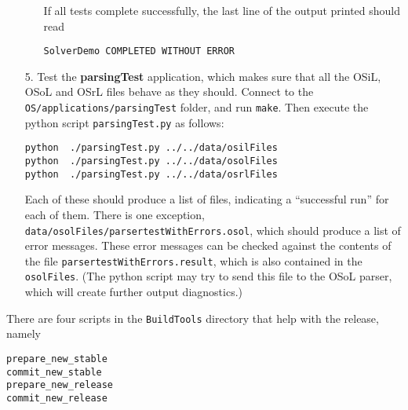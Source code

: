 \begin{itemize}
\begin{itemize}
If all tests complete successfully, the last line of the output printed should read
\begin{verbatim}
SolverDemo COMPLETED WITHOUT ERROR
\end{verbatim}

\end{itemize}


\iffalse
\item[b.] Test the {\bf OSFileUpload} application.    Edit  {\bf OSFileUpload.cpp}. First comment out line 79 and then modify line 
\begin{verbatim}
osagent = new OSSolverAgent("http://******/os/servlet/OSFileUpload");
\end{verbatim}
to
{\small
\begin{verbatim}
osagent = new OSSolverAgent("http://gsbkip.chicagogsb.edu/os/servlet/OSFileUpload");
\end{verbatim}
}
Rebuild and run. This application takes one command line argument which is the file to be uploaded. 
\fi


\item[5.] Test the {\bf parsingTest} application, which makes sure that all the OSiL, OSoL and OSrL files behave as they should. Connect to the {\tt OS/applications/parsingTest} folder, and run {\tt make}.  Then execute the python script {\tt parsingTest.py} as follows:  

\begin{verbatim}
python  ./parsingTest.py ../../data/osilFiles
python  ./parsingTest.py ../../data/osolFiles
python  ./parsingTest.py ../../data/osrlFiles
\end{verbatim}

Each of these should produce a list of files, indicating a ``successful run'' for each of them. There is one exception, {\tt data/osolFiles/parsertestWithErrors.osol}, which should produce a list of error messages. These error messages can be checked against the contents of the file 
{\tt parsertestWithErrors.result}, which is also contained in the {\tt osolFiles}. (The python script may try to send this file to the OSoL parser, which will create further output diagnostics.)
\end{itemize}


\label{section:ReleasePrep}

There are four scripts in the {\tt BuildTools} directory that help with the release, namely

\begin{verbatim}
prepare_new_stable
commit_new_stable
prepare_new_release
commit_new_release
\end{verbatim}

